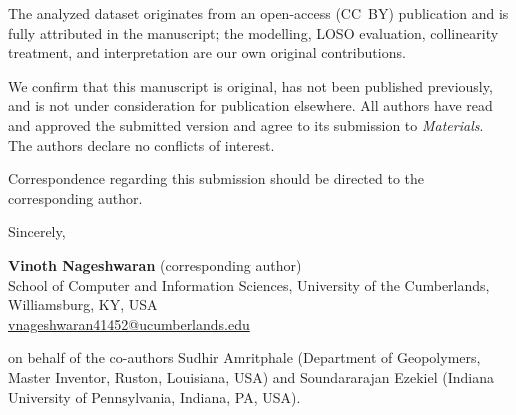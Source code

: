 \documentclass[10pt]{article}
\begin{document}
The analyzed dataset originates from an open-access (CC~BY) publication and is fully
attributed in the manuscript; the modelling, LOSO evaluation, collinearity treatment, and
interpretation are our own original contributions.

We confirm that this manuscript is original, has not been published previously, and is not
under consideration for publication elsewhere. All authors have read and approved the
submitted version and agree to its submission to \emph{Materials}. The authors declare no
conflicts of interest.

\vspace{4pt}
\noindent Correspondence regarding this submission should be directed to the corresponding
author.

\vspace{14pt}
\noindent Sincerely,

\vspace{4pt}
\noindent \textbf{Vinoth Nageshwaran} (corresponding author)\\
School of Computer and Information Sciences, University of the Cumberlands,
Williamsburg, KY, USA\\
\href{mailto:vnageshwaran41452@ucumberlands.edu}{vnageshwaran41452@ucumberlands.edu}

\vspace{6pt}
\noindent on behalf of the co-authors Sudhir Amritphale (Department of Geopolymers,
Master Inventor, Ruston, Louisiana, USA) and Soundararajan Ezekiel (Indiana
University of Pennsylvania, Indiana, PA, USA).
\end{document}
